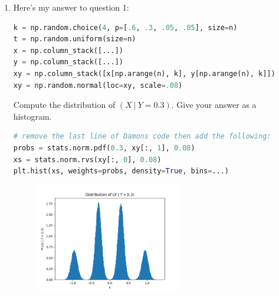 \documentclass[10pt,\jkfside,a4paper]{article}
\begin{document}
\begin{enumerate}
\begin{enumerate}[label=(\alph*)]
\begin{itemize}
\end{itemize}

\end{enumerate}

\item Here's my answer to question 1:

\begin{lstlisting}[language=Python]
k = np.random.choice(4, p=[.6, .3, .05, .05], size=n)
t = np.random.uniform(size=n)
x = np.column_stack([...])
y = np.column_stack([...])
xy = np.column_stack([x[np.arange(n), k], y[np.arange(n), k]])
xy = np.random.normal(loc=xy, scale=.08)
\end{lstlisting}

Compute the distribution of $(X \ | \ Y = 0.3)$. Give your answer as a
histogram.

\begin{lstlisting}[language=Python]
# remove the last line of Damons code then add the following:
probs = stats.norm.pdf(0.3, xy[:, 1], 0.08)
xs = stats.norm.rvs(xy[:, 0], 0.08)
plt.hist(xs, weights=probs, density=True, bins=...)
\end{lstlisting}

\begin{figure}[H]
\centering
\includegraphics[width=0.6\textwidth]{
./distribution_of_x_given_y_is_nought_point_three}
\end{figure}

\end{enumerate}
\end{document}
